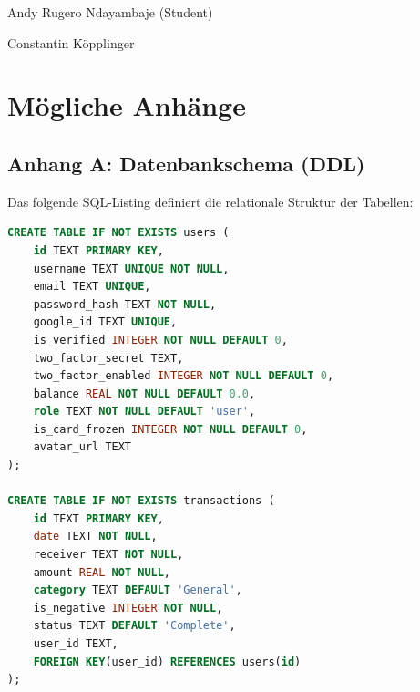 \documentclass[11pt,a4paper]{article}
\begin{document}
\vspace{0.5cm}

\begin{tcolorbox}[colback=bglight, colframe=accentblue, arc=4pt]
\begin{description}[leftmargin=3.8cm, labelwidth=3.5cm]
    \item[\textbf{Software-Entwickler:}] Andy Rugero Ndayambaje (Student)
    \item[\textbf{Projektleiter / Fachbetreuer:}] Constantin Köpplinger
\end{description}
\end{tcolorbox}

\newpage

\section{Mögliche Anhänge}

\subsection{Anhang A: Datenbankschema (DDL)}
Das folgende SQL-Listing definiert die relationale Struktur der Tabellen:
\begin{lstlisting}[language=SQL]
CREATE TABLE IF NOT EXISTS users (
    id TEXT PRIMARY KEY,
    username TEXT UNIQUE NOT NULL,
    email TEXT UNIQUE,
    password_hash TEXT NOT NULL,
    google_id TEXT UNIQUE,
    is_verified INTEGER NOT NULL DEFAULT 0,
    two_factor_secret TEXT,
    two_factor_enabled INTEGER NOT NULL DEFAULT 0,
    balance REAL NOT NULL DEFAULT 0.0,
    role TEXT NOT NULL DEFAULT 'user',
    is_card_frozen INTEGER NOT NULL DEFAULT 0,
    avatar_url TEXT
);

CREATE TABLE IF NOT EXISTS transactions (
    id TEXT PRIMARY KEY,
    date TEXT NOT NULL,
    receiver TEXT NOT NULL,
    amount REAL NOT NULL,
    category TEXT DEFAULT 'General',
    is_negative INTEGER NOT NULL,
    status TEXT DEFAULT 'Complete',
    user_id TEXT,
    FOREIGN KEY(user_id) REFERENCES users(id)
);
\end{lstlisting}
\end{document}
